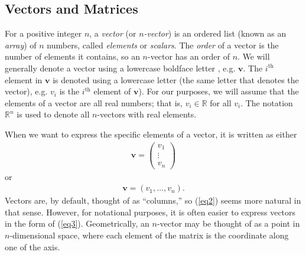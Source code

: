 \documentclass[10pt]{article}
\newcommand{\mydef}[1]{\textcolor{SteelBlue3}{\textit{#1}}} %
\begin{document}
\subsection{Vectors and Matrices}

For a positive integer $n$, a \mydef{vector} (or \mydef{$n$-vector}) is an ordered list (known as an \mydef{array}) of $n$ numbers, called \mydef{elements} or \mydef{scalars}. The \mydef{order} of a vector is the number of elements it contains, so an $n$-vector has an order of $n$. We will generally denote a vector using a lowercase boldface letter
, e.g. $\mathbf{v}$. The $i^{\text{th}}$ element in $\mathbf{v}$ is denoted using a lowercase letter (the same letter that denotes the vector), e.g. $v_i$ is the $i^{\text{th}}$ element of $\mathbf{v}$). For our purposes, we will assume that the elements of a vector are all real numbers; that is, $v_i \in \mathbb{R}$ for all $v_i$. The notation $\mathbb{R}^n$ is used to denote all $n$-vectors with real elements. 

When we want to express the specific elements of a vector, it is written as either  
\begin{align}
    \mathbf{v} = \begin{pmatrix}
        v_1 \\ \vdots \\ v_n
    \end{pmatrix} \label{eq2}
\end{align}
or 
\begin{align}
    \mathbf{v} = (v_1, \ldots, v_n). \label{eq3}
\end{align}
Vectors are, by default, thought of as ``columns,'' so (\ref{eq2}) seems more natural in that sense. However, for notational purposes, it is often easier to express vectors in the form of (\ref{eq3}). %
Geometrically, an $n$-vector may be thought of as a point in $n$-dimensional space, where each element of the matrix is the coordinate along one of the axis. 
\end{document}
